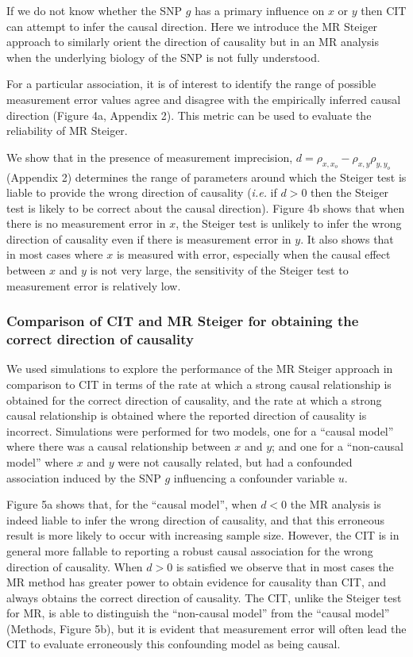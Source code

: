 \documentclass[]{article}
\begin{document}
If we do not know whether the SNP \(g\) has a primary influence on \(x\)
or \(y\) then CIT can attempt to infer the causal direction. Here we
introduce the MR Steiger approach to similarly orient the direction of
causality but in an MR analysis when the underlying biology of the SNP
is not fully understood.

For a particular association, it is of interest to identify the range of
possible measurement error values agree and disagree with the
empirically inferred causal direction (Figure 4a, Appendix 2). This
metric can be used to evaluate the reliability of MR Steiger.

We show that in the presence of measurement imprecision,
\(d = \rho_{x, x_o} - \rho_{x,y}\rho_{y,y_o}\) (Appendix 2) determines
the range of parameters around which the Steiger test is liable to
provide the wrong direction of causality (\emph{i.e.} if \(d>0\) then
the Steiger test is likely to be correct about the causal direction).
Figure 4b shows that when there is no measurement error in \(x\), the
Steiger test is unlikely to infer the wrong direction of causality even
if there is measurement error in \(y\). It also shows that in most cases
where \(x\) is measured with error, especially when the causal effect
between \(x\) and \(y\) is not very large, the sensitivity of the
Steiger test to measurement error is relatively low.

\subsubsection{Comparison of CIT and MR Steiger for obtaining the
correct direction of
causality}\label{comparison-of-cit-and-mr-steiger-for-obtaining-the-correct-direction-of-causality}

We used simulations to explore the performance of the MR Steiger
approach in comparison to CIT in terms of the rate at which a strong
causal relationship is obtained for the correct direction of causality,
and the rate at which a strong causal relationship is obtained where the
reported direction of causality is incorrect. Simulations were performed
for two models, one for a ``causal model'' where there was a causal
relationship between \(x\) and \(y\); and one for a ``non-causal model''
where \(x\) and \(y\) were not causally related, but had a confounded
association induced by the SNP \(g\) influencing a confounder variable
\(u\).

Figure 5a shows that, for the ``causal model'', when \(d < 0\) the MR
analysis is indeed liable to infer the wrong direction of causality, and
that this erroneous result is more likely to occur with increasing
sample size. However, the CIT is in general more fallable to reporting a
robust causal association for the wrong direction of causality. When
\(d > 0\) is satisfied we observe that in most cases the MR method has
greater power to obtain evidence for causality than CIT, and always
obtains the correct direction of causality. The CIT, unlike the Steiger
test for MR, is able to distinguish the ``non-causal model'' from the
``causal model'' (Methods, Figure 5b), but it is evident that
measurement error will often lead the CIT to evaluate erroneously this
confounding model as being causal.
\end{document}
